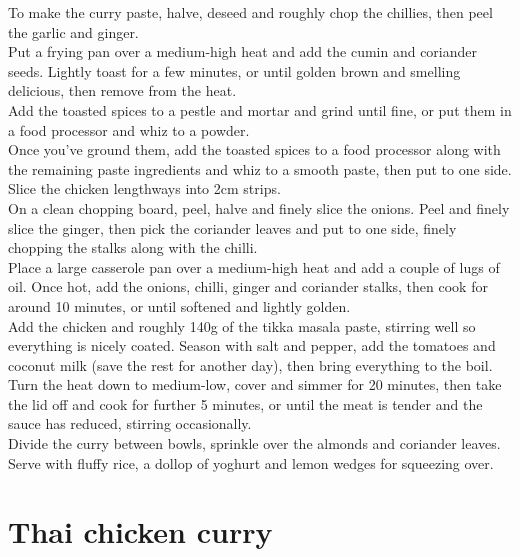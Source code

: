 \documentclass{tufte-book}
\begin{document}
\smallskip
To make the curry paste, halve, deseed and roughly chop the chillies, then peel the garlic and ginger. 
\\Put a frying pan over a medium-high heat and add the cumin and coriander seeds. Lightly toast for a few minutes, or until golden brown and smelling delicious, then remove from the heat. 
\\Add the toasted spices to a pestle and mortar and grind until fine, or put them in a food processor and whiz to a powder. 
\\Once you've ground them, add the toasted spices to a food processor along with the remaining paste ingredients and whiz to a smooth paste, then put to one side.
\\Slice the chicken lengthways into 2cm strips. 
\\On a clean chopping board, peel, halve and finely slice the onions. Peel and finely slice the ginger, then pick the coriander leaves and put to one side, finely chopping the stalks along with the chilli.
\\Place a large casserole pan over a medium-high heat and add a couple of lugs of oil. Once hot, add the onions, chilli, ginger and coriander stalks, then cook for around 10 minutes, or until softened and lightly golden. 
\\Add the chicken and roughly 140g of the tikka masala paste, stirring well so everything is nicely coated. Season with salt and pepper, add the tomatoes and coconut milk (save the rest for another day), then bring everything to the boil.
\\Turn the heat down to medium-low, cover and simmer for 20 minutes, then take the lid off and cook for further 5 minutes, or until the meat is tender and the sauce has reduced, stirring occasionally. 
\\Divide the curry between bowls, sprinkle over the almonds and coriander leaves. Serve with fluffy rice, a dollop of yoghurt and lemon wedges for squeezing over.


\section{Thai chicken curry}
\end{document}

